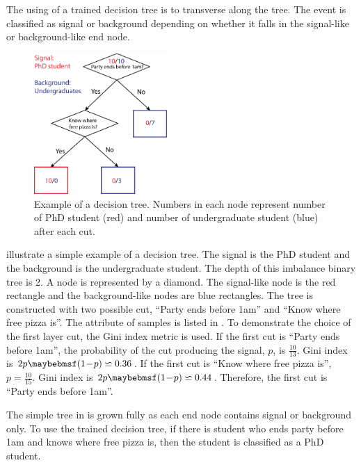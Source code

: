 The using of a trained decision tree is to transverse along the tree. The event is classified as signal or background depending on whether it falls in the signal-like or background-like end node.

\begin{figure}[!tbp]
\includegraphics[width=0.45\textwidth]{doubleHiggs/mva/BDTcomic}
\caption[Example of a decision tree. ]
{Example of a decision tree. Numbers in each node represent number of PhD student (red) and number of undergraduate student (blue) after each cut.}
   \label{fig:doubleHiggsMVAdecisionTree}
\end{figure}

 illustrate a simple example of a decision tree. The signal is the PhD student and the background is the undergraduate student. The depth of this imbalance binary  tree is 2. A node is represented by a diamond.  The signal-like node is the red rectangle and the background-like nodes are blue rectangles. The tree is constructed with two possible cut, ``Party ends before 1am'' and ``Know where free pizza is''. The attribute of samples is listed in . To demonstrate the choice of the first layer cut, the Gini index metric is used. If the first cut is ``Party ends before 1am'', the probability of the cut producing the signal, $p$, is $\frac{10}{13}$. Gini index is $2p\parenths{1\!-\!p} \backsimeq 0.36 $. If the first cut is ``Know where free pizza is'', $p=\frac{10}{15}$. Gini index is $2p\parenths{1\!-\!p} \backsimeq 0.44 $. Therefore, the first cut is ``Party ends before 1am''.

The simple tree in  is grown fully as each end node contains signal or background only. To use the trained decision tree, if there is student who ends party before 1am and knows where free pizza is, then the student is classified as a PhD student.

